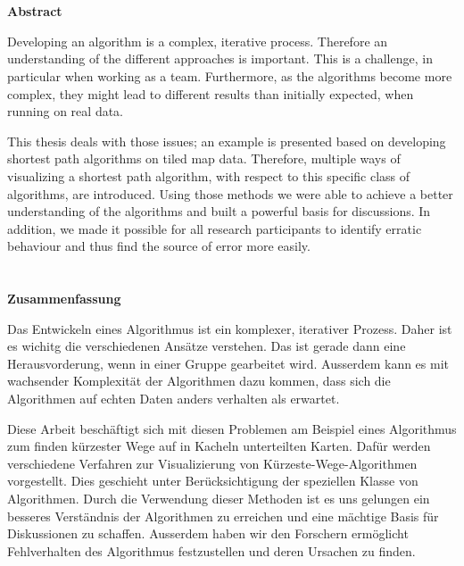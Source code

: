 \chapter*{}
\thispagestyle{empty}

\begin{center}
    \large \textbf{Abstract}
\end{center}

Developing an algorithm is a complex, iterative process.
Therefore an understanding of the different approaches is important.
This is a challenge, in particular when working as a team.
Furthermore, as the algorithms become more complex, they might lead to different results than initially expected, when running on real data.

This thesis deals with those issues; an example is presented based on developing shortest path algorithms on tiled map data.
Therefore, multiple ways of visualizing a shortest path algorithm, with respect to this specific class of algorithms, are introduced.
Using those methods we were able to achieve a better understanding of the algorithms and built a powerful basis for discussions.
In addition, we made it possible for all research participants to identify erratic behaviour and thus find the source of error more easily.

\chapter*{}
\thispagestyle{empty}

\begin{center}
    \large \textbf{Zusammenfassung}
\end{center}

Das Entwickeln eines Algorithmus ist ein komplexer, iterativer Prozess.
Daher ist es wichitg die verschiedenen Ansätze verstehen.
Das ist gerade dann eine Herausvorderung, wenn in einer Gruppe gearbeitet wird.
Ausserdem kann es mit wachsender Komplexität der Algorithmen dazu kommen, dass sich die Algorithmen auf echten Daten anders verhalten als erwartet.

Diese Arbeit beschäftigt sich mit diesen Problemen am Beispiel eines Algorithmus zum finden kürzester Wege auf in Kacheln unterteilten Karten.
Dafür werden verschiedene Verfahren zur Visualizierung von Kürzeste-Wege-Algorithmen vorgestellt.
Dies geschieht unter Berücksichtigung der speziellen Klasse von Algorithmen.
Durch die Verwendung dieser Methoden ist es uns gelungen ein besseres Verständnis der Algorithmen zu erreichen und eine mächtige Basis für Diskussionen zu schaffen.
Ausserdem haben wir den Forschern ermöglicht Fehlverhalten des Algorithmus festzustellen und deren Ursachen zu finden.
